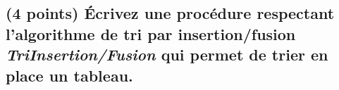 \documentclass[11pt,a4paper]{article}
\begin{document}
\bigskip

\begin{center}
\end{center}



\vfillLast
\newpage

\subsection{(4 points) \'Ecrivez une procédure respectant l'algorithme de tri par insertion/fusion \og \textit{TriInsertion/Fusion} \fg{} qui permet de trier en place un tableau. }

\bigskip

\begin{center}
\end{center}
\end{document}
